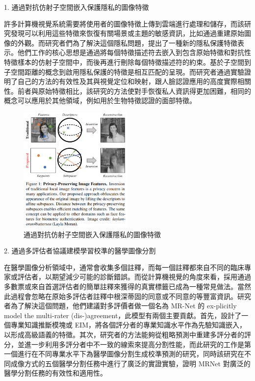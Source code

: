 \documentclass[10pt,UTF8]{ctexart}
\begin{document}
1. 通過對抗仿射子空間嵌入保護隱私的圖像特徵

許多計算機視覺系統需要將使用者的圖像特徵上傳到雲端進行處理和儲存，而該研究發現可以利用這些特徵來恢復有關場景或主題的敏感資訊，比如通過重建原始圖像的外觀。而研究者們為了解決這個隱私問題，提出了一種新的隱私保護特徵表示。他們工作的核心思想是通過將每個特徵描述符去嵌入到包含原始特徵和對抗性特徵樣本的仿射子空間中，而後再進行刪除每個特徵描述符的約束。基於子空間到子空間距離的概念到啟用隱私保護的特徵是相互匹配的呈現。而研究者通過實驗證明了自己的方法的有效性及其與視覺定位和映射，跟人臉認證應用的高度實際相關性。前者與原始特徵相比，該研究的方法使對手恢復私人資訊得更加困難，相同的概念可以應用於其他領域，例如用於生物特徵認證的面部特徵。

\begin{figure}[H]
\centering 
\includegraphics[width=0.50\textwidth]{r1.png} 
\caption{通過對抗仿射子空間嵌入保護隱私的圖像特徵}
\label{Test}
\end{figure}

2. 通過多評估者協議建模學習校準的醫學圖像分割

在醫學圖像分析領域中，通常會收集多個註釋，而每一個註釋都來自不同的臨床專家或評估者，以期望減少可能的診斷錯誤。而從計算機視覺的角度來看，採用通過多數票或來自首選評估者的簡單註釋來獲得的真實標籤已成為一種常見做法。當然此過程會忽略在原始多評估者註釋中根深蒂固的同意或不同意的等豐富資訊。研究者為了解決這個問題，他們建議對多評價者做一個名為 MR-Net 的 ex-plicitly model the multi-rater (dis-)agreement，此模型有兩個主要貢獻。首先，設計了一個專業知識推斷模塊或 EIM，將各個評分者的專業知識水平作為先驗知識嵌入，以形成高級語義的特徵。其次，研究者的方法能夠從粗略預測中重建多評分者的評分，並進一步利用多評分者中不一致的線索來提高分割性能，而此研究的工作是第一個進行在不同專業水平下為醫學圖像分割生成校準預測的研究，同時該研究在不同成像方式的五個醫學分割任務中進行了廣泛的實證實驗，證明 MRNet 對廣泛的醫學分割任務的有效性和適用性。
\end{document}
